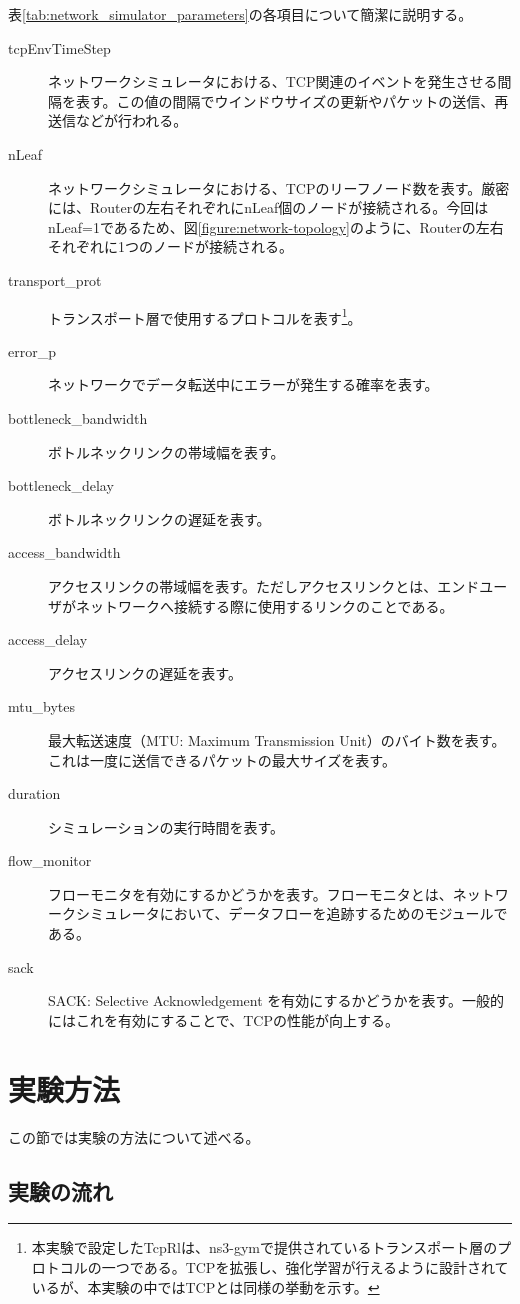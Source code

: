 \documentclass[a4paper,11pt]{jreport}
\newcommand{\figref}[1]{図\ref{#1}}
\newcommand{\tabref}[1]{表\ref{#1}}
\begin{document}
\tabref{tab:network_simulator_parameters}の各項目について簡潔に説明する。
\begin{description}
  \item[tcpEnvTimeStep] ネットワークシミュレータにおける、TCP関連のイベントを発生させる間隔を表す。この値の間隔でウインドウサイズの更新やパケットの送信、再送信などが行われる。
  \item[nLeaf] ネットワークシミュレータにおける、TCPのリーフノード数を表す。厳密には、Routerの左右それぞれにnLeaf個のノードが接続される。今回はnLeaf=1であるため、\figref{figure:network-topology}のように、Routerの左右それぞれに1つのノードが接続される。
  \item[transport\_prot] トランスポート層で使用するプロトコルを表す\footnote{本実験で設定したTcpRlは、ns3-gymで提供されているトランスポート層のプロトコルの一つである。TCPを拡張し、強化学習が行えるように設計されているが、本実験の中ではTCPとは同様の挙動を示す。}。
  \item[error\_p] ネットワークでデータ転送中にエラーが発生する確率を表す。
  \item[bottleneck\_bandwidth] ボトルネックリンクの帯域幅を表す。
  \item[bottleneck\_delay] ボトルネックリンクの遅延を表す。
  \item[access\_bandwidth] アクセスリンクの帯域幅を表す。ただしアクセスリンクとは、エンドユーザがネットワークへ接続する際に使用するリンクのことである。
  \item[access\_delay] アクセスリンクの遅延を表す。
  \item[mtu\_bytes] 最大転送速度（MTU: Maximum Transmission Unit）のバイト数を表す。これは一度に送信できるパケットの最大サイズを表す。
  \item[duration] シミュレーションの実行時間を表す。
  \item[flow\_monitor] フローモニタを有効にするかどうかを表す。フローモニタとは、ネットワークシミュレータにおいて、データフローを追跡するためのモジュールである。
  \item[sack] SACK: Selective Acknowledgement を有効にするかどうかを表す。一般的にはこれを有効にすることで、TCPの性能が向上する。
\end{description}


\section{実験方法}
\label{section:experiment-method}
この節では実験の方法について述べる。

\subsection{実験の流れ}
\end{document}
